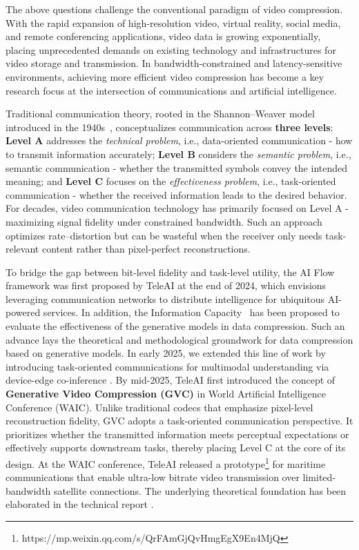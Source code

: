 \documentclass{fairmeta}
\begin{document}
The above questions challenge the conventional paradigm of video compression. With the rapid expansion of high-resolution video, virtual reality, social media, and remote conferencing applications, video data is growing exponentially, placing unprecedented demands on existing technology and infrastructures for video storage and transmission. In bandwidth-constrained and latency-sensitive environments, achieving more efficient video compression has become a key research focus at the intersection of communications and artificial intelligence. 

Traditional communication theory, rooted in the Shannon–Weaver model introduced in the 1940s~\citep{shannon1948mathematical}, conceptualizes communication across \textbf{three levels}: \textbf{Level A} addresses the \textit{technical problem}, i.e., data-oriented communication - how to transmit information accurately; \textbf{Level B} considers the \textit{semantic problem}, i.e., semantic communication - whether the transmitted symbols convey the intended meaning; and \textbf{Level C} focuses on the \textit{effectiveness problem}, i.e., task-oriented communication - whether the received information leads to the desired behavior. 
For decades, video communication technology has primarily focused on Level A - maximizing signal fidelity under constrained bandwidth. 
Such an approach optimizes rate–distortion but can be wasteful when the receiver only needs task-relevant content rather than pixel-perfect reconstructions.

To bridge the gap between bit-level fidelity and task-level utility, the AI Flow framework \citep{aiflow} was first proposed by TeleAI at the end of 2024, which envisions leveraging communication networks to distribute intelligence for ubiquitous AI-powered services.
In addition, the Information Capacity~\citep{yuan2025information} has been proposed to evaluate the effectiveness of the generative models in data compression.
Such an advance lays the theoretical and methodological groundwork for data compression based on generative models.
In early 2025, we extended this line of work by introducing task-oriented communications for multimodal understanding via device-edge co-inference \citep{11222951_yuan_task_oriented}.
By mid-2025, TeleAI first introduced the concept of \textbf{Generative Video Compression (GVC)} in World Artificial Intelligence Conference (WAIC). 
Unlike traditional codecs that emphasize pixel-level reconstruction fidelity, GVC adopts a task-oriented communication perspective. 
It prioritizes whether the transmitted information meets perceptual expectations or effectively supports downstream tasks, thereby placing Level C at the core of its design.
At the WAIC conference, TeleAI released a prototype\footnote{https://mp.weixin.qq.com/s/QrFAmGjQvHmgEgX9En4MjQ} for maritime communications that enable ultra-low bitrate video transmission over limited-bandwidth satellite connections.
The underlying theoretical foundation has been elaborated in the technical report \citep{an2506ai}.
\end{document}
